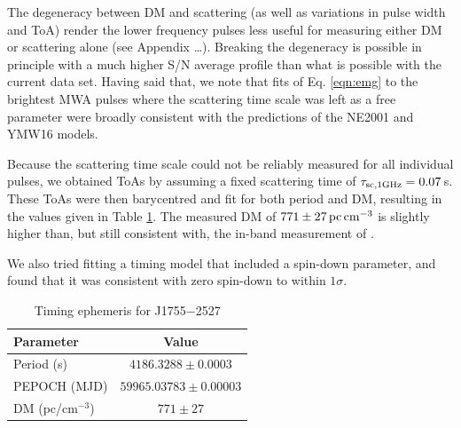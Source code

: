 \documentclass[preprint2,linenumbers]{aastex631}
\newcommand{\todo}[1]{{\color{red}#1}}
\newcommand{\src}{J1755$-$2527}
\begin{document}
The degeneracy between DM and scattering (as well as variations in pulse width and ToA) render the lower frequency pulses less useful for measuring either DM or scattering alone (\todo{see Appendix \dots}).
Breaking the degeneracy is possible in principle with a much higher S/N average profile than what is possible with the current data set.
Having said that, we note that fits of Eq. \eqref{eqn:emg} to the brightest MWA pulses where the scattering time scale was left as a free parameter were broadly consistent with the predictions of the NE2001 and YMW16 models.

Because the scattering time scale could not be reliably measured for all individual pulses, we obtained ToAs by assuming a fixed scattering time of $\tau_{\rm sc,1 GHz} = 0.07\,$s.
These ToAs were then barycentred and fit for both period and DM, resulting in the values given in Table \ref{tbl:ephemeris}.
The measured DM of $771 \pm 27\,{\rm pc}\,{\rm cm}^{-3}$ is slightly higher than, but still consistent with, the in-band measurement of .

We also tried fitting a timing model that included a spin-down parameter, and found that it was consistent with zero spin-down to within $1\sigma$.

\begin{table}
  \caption{Timing ephemeris for \src{}}
  \label{tbl:ephemeris}
  \begin{tabular}{lc}
    \hline
    Parameter & Value \\
    \hline
    Period (s) & $4186.3288 \pm 0.0003$ \\
    PEPOCH (MJD) & $59965.03783 \pm 0.00003$ \\
    DM (pc/cm$^{-3}$) & $771 \pm 27$ \\
    \hline
  \end{tabular}
\end{table}

\end{document}
